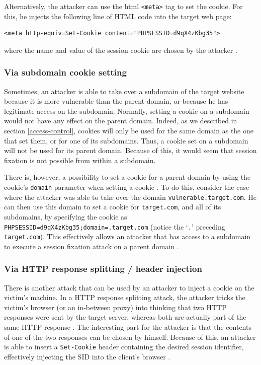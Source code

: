 Alternatively, the attacker can use the \gls{html} \texttt{<meta>} tag to set the cookie. For this, he injects the following line of HTML code into the target web page:
\begin{lstlisting}
<meta http-equiv=Set-Cookie content="PHPSESSID=d9qX4zKbg35">
\end{lstlisting}
where the name and value of the session cookie are chosen by the attacker \cite{Kolsek2002}.

\subsubsection{Via subdomain cookie setting}

Sometimes, an attacker is able to take over a subdomain of the target website because it is more vulnerable than the parent domain, or because he has legitimate access on the subdomain. Normally, setting a cookie on a subdomain would not have any effect on the parent domain. Indeed, as we described in section \ref{access-control}, cookies will only be used for the same domain as the one that set them, or for one of its subdomains. Thus, a cookie set on a subdomain will not be used for its parent domain. Because of this, it would seem that session fixation is not possible from within a subdomain.

There is, however, a possibility to set a cookie for a parent domain by using the cookie's \texttt{domain} parameter when setting a cookie \cite{rfc2109}. To do this, consider the case where the attacker was able to take over the domain \texttt{vulnerable.target.com}. He can then use this domain to set a cookie for \texttt{target.com}, and all of its subdomains, by specifying the cookie as \texttt{PHPSESSID=d9qX4zKbg35;domain=.target.com} (notice the `\texttt{.}' preceding \texttt{target.com}). This effectively allows an attacker that has access to a subdomain to execute a session fixation attack on a parent domain \cite{Kolsek2002}.

\subsubsection{Via HTTP response splitting / header injection}

There is another attack that can be used by an attacker to inject a cookie on the victim's machine. In a HTTP response splitting attack, the attacker tricks the victim's browser (or an in-between proxy) into thinking that two HTTP responses were sent by the target server, whereas both are actually part of the same HTTP response \cite{Klein2004}. The interesting part for the attacker is that the contents of one of the two responses can be chosen by himself. Because of this, an attacker is able to insert a \texttt{Set-Cookie} header containing the desired session identifier, effectively injecting the SID into the client's browser \cite{Johns2011}.

